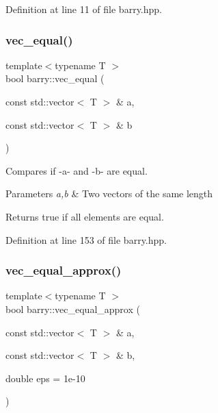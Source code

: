 Definition at line 11 of file barry.\+hpp.

\mbox{\label{namespacebarry_afbdb85734a7793890ea4268ea114858e}} 
\subsubsection{\texorpdfstring{vec\+\_\+equal()}{vec\_equal()}}
{\footnotesize\ttfamily template$<$typename T $>$ \\
bool barry\+::vec\+\_\+equal (\begin{DoxyParamCaption}\item[{const std\+::vector$<$ T $>$ \&}]{a,  }\item[{const std\+::vector$<$ T $>$ \&}]{b }\end{DoxyParamCaption})\hspace{0.3cm}{\ttfamily [inline]}}



Compares if -\/a-\/ and -\/b-\/ are equal. 


\begin{DoxyParams}{Parameters}
{\em a,b} & Two vectors of the same length \\
\hline
\end{DoxyParams}
\begin{DoxyReturn}{Returns}
{\ttfamily true} if all elements are equal. 
\end{DoxyReturn}


Definition at line 153 of file barry.\+hpp.

\mbox{\label{namespacebarry_a24c4bd4a99dd82edf66c2d3b645dca08}} 
\subsubsection{\texorpdfstring{vec\+\_\+equal\+\_\+approx()}{vec\_equal\_approx()}}
{\footnotesize\ttfamily template$<$typename T $>$ \\
bool barry\+::vec\+\_\+equal\+\_\+approx (\begin{DoxyParamCaption}\item[{const std\+::vector$<$ T $>$ \&}]{a,  }\item[{const std\+::vector$<$ T $>$ \&}]{b,  }\item[{double}]{eps = {\ttfamily 1e-\/10} }\end{DoxyParamCaption})\hspace{0.3cm}{\ttfamily [inline]}}



